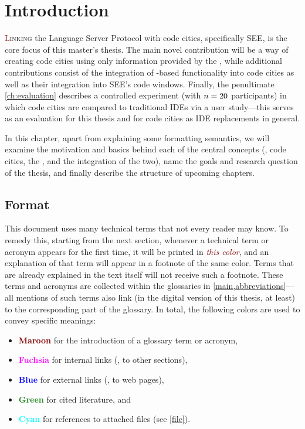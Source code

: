 \documentclass[../thesis]{subfiles}
\begin{document}
\chapter{Introduction}

\lettrine[lines=3]{\textcolor{Maroon}{L}}{inking} the Language Server Protocol with code cities, specifically SEE, is the core focus of this master's thesis.
The main novel contribution will be a way of creating code cities using only information provided by the , while additional contributions consist of the integration of -based functionality into code cities as well as their integration into SEE's code windows.
Finally, the penultimate \cref{ch:evaluation} describes a controlled experiment (with $n=20$ participants) in which code cities are compared to traditional IDEs via a user study---this serves as an evaluation for this thesis and for code cities as IDE replacements in general.

In this chapter, apart from explaining some formatting semantics, we will examine the motivation and basics behind each of the central concepts (\ie, code cities, the , and the integration of the two), name the goals and research question of the thesis, and finally describe the structure of upcoming chapters.

\section{Format}

This document uses many technical terms that not every reader may know.
To remedy this, starting from the next section, whenever a technical term or acronym appears for the first time, it will be printed in \emph{\textcolor{Maroon}{this color}}, and an explanation of that term will appear in a footnote of the same color.
Terms that are already explained in the text itself will not receive such a footnote.
These terms and acronyms are collected within the glossaries in \cref{main,abbreviations}---all mentions of such terms also link (in the digital version of this thesis, at least) to the corresponding part of the glossary.
In total, the following colors are used to convey specific meanings:
\begin{itemize}
	\item \textbf{\textcolor{Maroon}{Maroon}} for the introduction of a glossary term or acronym,
	\item \textbf{\textcolor{Fuchsia}{Fuchsia}} for internal links (\eg, to other sections),
	\item \textbf{\textcolor{Blue}{Blue}} for external links (\eg, to web pages),
	\item \textbf{\textcolor{ForestGreen}{Green}} for cited literature, and
	\item \textbf{\textcolor{Cyan}{Cyan}} for references to attached files (see \cref{file}).
\end{itemize}
\end{document}
